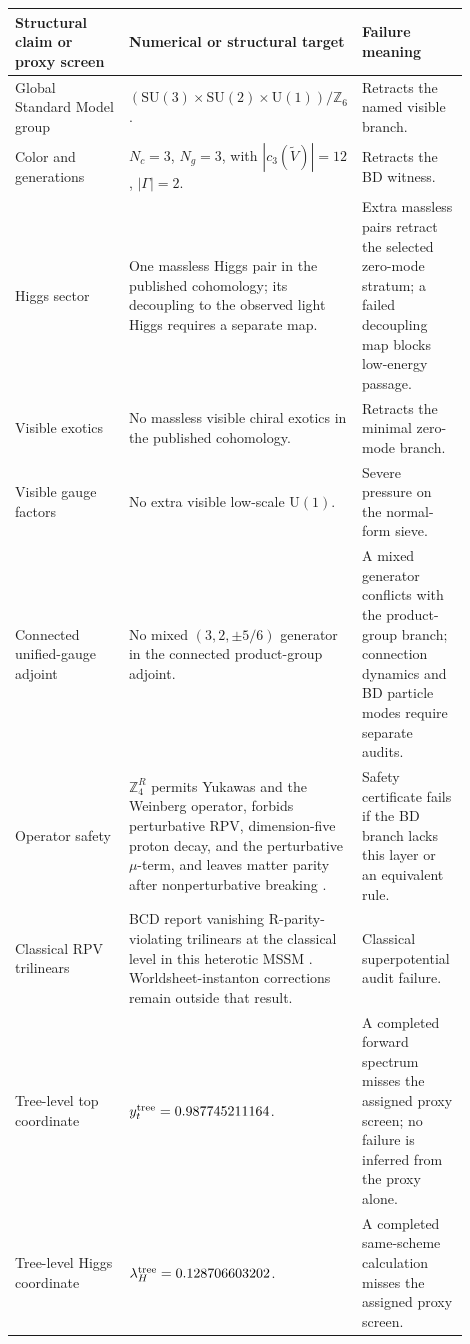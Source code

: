 \documentclass[11pt]{article}
\theoremstyle{remark}
\theoremstyle{plain}
\newcommand{\SU}{\mathrm{SU}}
\newcommand{\U}{\mathrm{U}}
\newcommand{\Z}{\mathbb Z}
\newcommand{\ZfourR}{\mathbb Z_4^R}
\begin{document}
\begin{longtable}{p{0.29\linewidth}p{0.37\linewidth}p{0.24\linewidth}}
\toprule
\textbf{Structural claim or proxy screen} & \textbf{Numerical or structural target} & \textbf{Failure meaning} \\
\midrule
Global Standard Model group &
\((\SU(3)\times\SU(2)\times\U(1))/\Z_6\). & Retracts the named visible branch. \\
Color and generations & \(N_c=3\), \(N_g=3\), with
\(|c_3(\widetilde V)|=12\), \(|\Gamma|=2\). & Retracts the BD witness. \\
Higgs sector & One massless Higgs pair in the published cohomology; its decoupling to the
observed light Higgs requires a separate map. & Extra massless pairs retract the selected
zero-mode stratum; a failed decoupling map blocks low-energy passage. \\
Visible exotics & No massless visible chiral exotics in the published cohomology. & Retracts the
minimal zero-mode branch. \\
Visible gauge factors & No extra visible low-scale \(\U(1)\). & Severe pressure on the
normal-form sieve. \\
Connected unified-gauge adjoint & No mixed \((3,2,\pm5/6)\) generator in the connected
product-group adjoint. & A mixed generator conflicts with the product-group
branch; connection dynamics and BD particle modes require separate audits. \\
Operator safety & \(\ZfourR\) permits Yukawas and the Weinberg operator, forbids perturbative
RPV, dimension-five proton decay, and the perturbative \(\mu\)-term, and leaves matter parity
after nonperturbative breaking \cite{LeeRabyRatzRossSchierenSchmidtHobergVaudrevange2010}. &
Safety certificate fails if the BD branch lacks this layer or an equivalent rule. \\
Classical RPV trilinears & BCD report vanishing R-parity-violating trilinears at the classical
level in this heterotic MSSM \cite{BouchardCveticDonagi2006}. Worldsheet-instanton corrections
remain outside that result. & Classical superpotential audit failure. \\
Tree-level top coordinate & \(y_t^{\rm tree}=0.987745211164\). & A completed forward spectrum
misses the assigned proxy screen; no failure is inferred from the proxy alone. \\
Tree-level Higgs coordinate & \(\lambda_H^{\rm tree}=0.128706603202\). & A completed
same-scheme calculation misses the assigned proxy screen. \\

\end{longtable}
\end{document}
